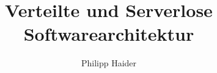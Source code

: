 \documentclass[master,german]{hgbthesis}
\begin{document}

\title{Verteilte und Serverlose Softwarearchitektur}
\author{Philipp Haider}

\frontmatter
\maketitle


\tableofcontents

\mainmatter           %






\MakeBibliography	%


\end{document}
